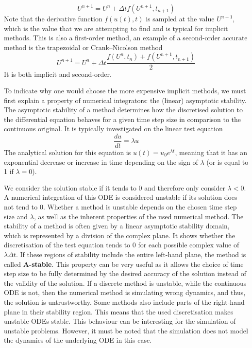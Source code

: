 \begin{equation}
\label{eq: backward Euler}
    U^{n+1} = U^n + \Delta t f(U^{n+1},t_{n+1})
\end{equation}
Note that the derivative function $f(u(t), t)$ is sampled at the value $U^{n+1}$, which is the value that we are attempting to find and is typical for implicit methods. This is also a first-order method, an example of a second-order accurate method is the trapezoidal or Crank--Nicolson method
\begin{equation}
\label{eq: Crank-Nicolson}
    U^{n+1} = U^n + \Delta t \frac{f(U^n,t_n) + f(U^{n+1},t_{n+1})}{2}
\end{equation}
It is both implicit and second-order.

To indicate why one would choose the more expensive implicit methods, we must first explain a property of numerical integrators: the (linear) asymptotic stability.
 The asymptotic stability of a method determines how the discretised solution to the differential equation behaves for a given time step size in comparison to the continuous original. It is typically investigated on the linear test equation
\[\frac{du}{dt} = \lambda u\]
The analytical solution for this equation is $u(t) = u_0 e^{\lambda t}$, meaning that it has an exponential decrease or increase in time depending on the sign of $\lambda$ (or is equal to 1 if $\lambda = 0$). 

We consider the solution stable if it tends to 0 and therefore only consider $\lambda < 0$. A numerical integration of this ODE is considered unstable if its solution does not tend to 0. 
Whether a method is unstable depends on the chosen time step size and $\lambda$, as well as the inherent properties of the used numerical method. 
The stability of a method is often given by a linear asymptotic stability domain, which is represented by a division of the complex plane. It shows whether the discretisation of the test equation tends to 0 for each possible complex value of $\lambda \Delta t$. If these regions of stability include the entire left-hand plane, the method is called \textbf{A-stable}. This property can be very useful as it allows the choice of time step size to be fully determined by the desired accuracy of the solution instead of the validity of the solution. If a discrete method is unstable, while the continuous ODE is not, then the numerical method is simulating wrong dynamics, and thus, the solution is untrustworthy. 
Some methods also include parts of the right-hand plane in their stability region. This means that the used discretisation makes unstable ODEs stable. This behaviour can be interesting for the simulation of unstable problems. However, it must be noted that the simulation does not model the dynamics of the underlying ODE in this case.

